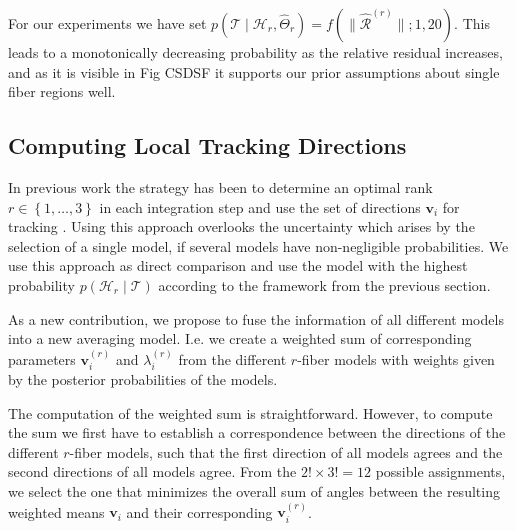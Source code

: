 For our experiments we have set $p \left(  \mathcal{T} \mid \mathcal{H}_r,
\hat{\Theta}_r \right) = f \left(  \| \hat{\mathcal{R}}^{\left( r \right)} \| ; 1,20
\right)$. This leads to a monotonically decreasing probability as the relative
residual increases, and as it is visible in Fig CSDSF it supports our prior
assumptions about single fiber regions well.

\subsection{Computing Local Tracking Directions}
In previous work the strategy has been to determine an optimal rank $r \in
\left\{ 1,\dots , 3 \right\}$ in each integration step and use the set of
directions $\mathbf{v}_i$ for tracking \cite{Anekele:CARS2017}. Using this
approach overlooks the uncertainty which arises by the selection of a single
model, if several models have non-negligible probabilities. We use this approach
as direct comparison and use the model with the highest probability $p \left(
 \mathcal{H}_r \mid \mathcal{T} \right)$ according to the framework from the
 previous section.
 
As a new contribution, we propose to fuse the information of all different
models into a new averaging model. I.e. we create a weighted sum of
corresponding parameters $\mathbf{v}_i^{\left( r \right)}$ and
$\lambda_i^{\left( r \right)}$ from the different
$r$-fiber models with weights given by the posterior probabilities of the
models.

The computation of the weighted sum is straightforward. However, to compute the
sum we first have to establish a correspondence between the directions of the
different $r$-fiber models, such that the first direction of all models agrees
and the second directions of all models agree. From the $2! \times 3! =12$ possible assignments, we
select the one that minimizes the overall sum of angles between the resulting
weighted means $\mathbf{v}_i$ and their corresponding $\mathbf{v}_i^{\left( r
\right)}$.
